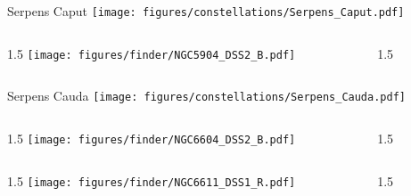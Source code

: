 \documentclass[final]{beamer}
\newlength{\colwidth}
\begin{document}

\begin{frame}[t]{\LARGE Serpens Caput}
  \centering
  \texttt{[image: figures/constellations/Serpens\_Caput.pdf]}
\end{frame}


\begin{frame}[t]{}
  \begin{columns}[T]
    \begin{column}{1.5\colwidth}
      \centering
      \texttt{[image: figures/finder/NGC5904\_DSS2\_B.pdf]}
    \end{column}
    \begin{column}{1.5\colwidth}
      \Large
      
    \end{column}
  \end{columns}
  \vspace{\fill}
\end{frame}


\begin{frame}[t]{\LARGE Serpens Cauda}
  \centering
  \texttt{[image: figures/constellations/Serpens\_Cauda.pdf]}
\end{frame}


\begin{frame}[t]{}
  \begin{columns}[T]
    \begin{column}{1.5\colwidth}
      \centering
      \texttt{[image: figures/finder/NGC6604\_DSS2\_B.pdf]}
    \end{column}
    \begin{column}{1.5\colwidth}
      \Large
      
    \end{column}
  \end{columns}
  \vspace{\fill}
  \begin{columns}[T]
    \begin{column}{1.5\colwidth}
      \centering
      \texttt{[image: figures/finder/NGC6611\_DSS1\_R.pdf]}
    \end{column}
    \begin{column}{1.5\colwidth}
      \Large
      
    \end{column}
  \end{columns}
\end{frame}
\end{document}
